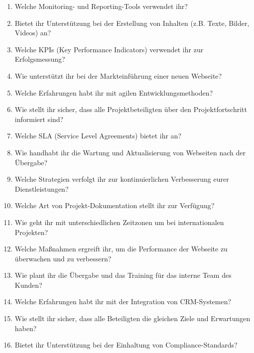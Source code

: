 \documentclass[a4paper,12pt]{article}
\begin{document}
\begin{enumerate}[resume]
    \item Welche Monitoring- und Reporting-Tools verwendet ihr?
    \item Bietet ihr Unterstützung bei der Erstellung von Inhalten (z.B. Texte, Bilder, Videos) an?
    \item Welche KPIs (Key Performance Indicators) verwendet ihr zur Erfolgsmessung?
    \item Wie unterstützt ihr bei der Markteinführung einer neuen Webseite?
    \item Welche Erfahrungen habt ihr mit agilen Entwicklungsmethoden?
    \item Wie stellt ihr sicher, dass alle Projektbeteiligten über den Projektfortschritt informiert sind?
    \item Welche SLA (Service Level Agreements) bietet ihr an?
    \item Wie handhabt ihr die Wartung und Aktualisierung von Webseiten nach der Übergabe?
    \item Welche Strategien verfolgt ihr zur kontinuierlichen Verbesserung eurer Dienstleistungen?
    \item Welche Art von Projekt-Dokumentation stellt ihr zur Verfügung?
    \item Wie geht ihr mit unterschiedlichen Zeitzonen um bei internationalen Projekten?
    \item Welche Maßnahmen ergreift ihr, um die Performance der Webseite zu überwachen und zu verbessern?
    \item Wie plant ihr die Übergabe und das Training für das interne Team des Kunden?
    \item Welche Erfahrungen habt ihr mit der Integration von CRM-Systemen?
    \item Wie stellt ihr sicher, dass alle Beteiligten die gleichen Ziele und Erwartungen haben?
    \item Bietet ihr Unterstützung bei der Einhaltung von Compliance-Standards?
\end{enumerate}
\end{document}
